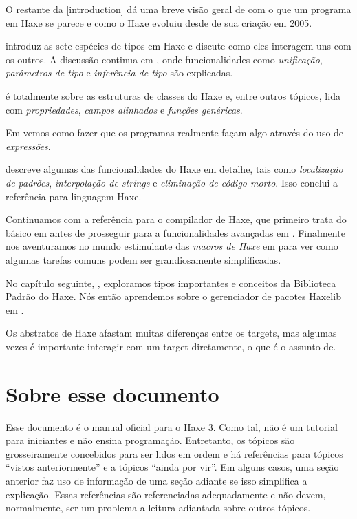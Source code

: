 O restante da \ref{introduction} dá uma breve visão geral de com o que um programa em Haxe se parece e como o Haxe evoluiu desde de sua criação em 2005.

 introduz as sete espécies de tipos em Haxe e discute como eles interagem uns com os outros. A discussão continua em , onde funcionalidades como \emph{unificação}, \emph{parâmetros de tipo} e \emph{inferência de tipo} são explicadas.

 é totalmente sobre as estruturas de classes do Haxe e, entre outros tópicos, lida com \emph{propriedades}, \emph{campos alinhados} e \emph{funções genéricas}.

Em  vemos como fazer que os programas realmente façam algo através do uso de \emph{expressões}.

 descreve algumas das funcionalidades do Haxe em detalhe, tais como \emph{localização de padrões}, \emph{interpolação de strings} e \emph{eliminação de código morto}. Isso conclui a referência para linguagem Haxe.

Continuamos com a referência para o compilador de Haxe, que primeiro trata do básico em  antes de prosseguir para a funcionalidades avançadas em . Finalmente nos aventuramos no mundo estimulante das \emph{macros de Haxe} em  para ver como algumas tarefas comuns podem ser grandiosamente simplificadas.

No capítulo seguinte, , exploramos tipos importantes e conceitos da Biblioteca Padrão do Haxe. Nós então aprendemos sobre o gerenciador de pacotes Haxelib em .

Os abstratos de Haxe afastam muitas diferenças entre os targets, mas algumas vezes é importante interagir com um target diretamente, o que é o assunto de.

\section{Sobre esse documento}
\label{introduction-about-this-document}

Esse documento é o manual oficial para o Haxe 3. Como tal, não é um tutorial para iniciantes e não ensina programação. Entretanto, os tópicos são grosseiramente concebidos para ser lidos em ordem e há referências para tópicos ``vistos anteriormente'' e a tópicos ``ainda por vir''. Em alguns casos, uma seção anterior faz uso de informação de uma seção adiante se isso simplifica a explicação. Essas referências são referenciadas adequadamente e não devem, normalmente, ser um problema a leitura adiantada sobre outros tópicos.

